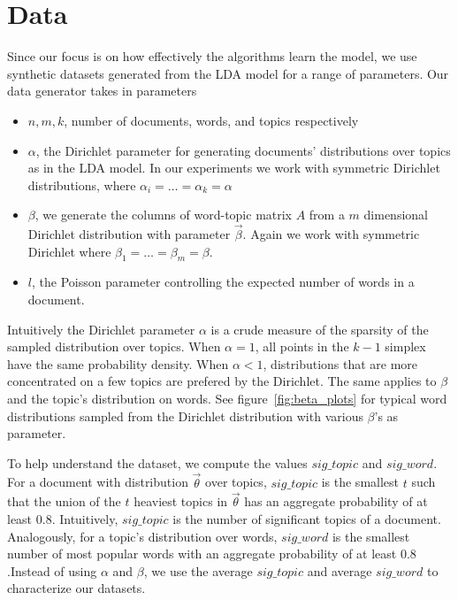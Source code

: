 \documentclass{article}
\begin{document}
\section{Data} \label{sec:data}
Since our focus is on how effectively the algorithms learn the model, we use synthetic datasets generated from the LDA model for a range of parameters. Our data generator takes in parameters
\begin{itemize}
	\item $n,m,k$, number of documents, words, and topics respectively
	\item $\alpha$, the Dirichlet parameter for generating documents' distributions over topics as in the LDA model. In our experiments we work with symmetric Dirichlet distributions, where $\alpha_i=\ldots=\alpha_k=\alpha$
	\item $\beta$, we generate the columns of word-topic matrix $A$ from a $m$ dimensional Dirichlet distribution with parameter $\vec{\beta}$. Again we work with symmetric Dirichlet where $\beta_1=\ldots=\beta_m=\beta$. 
	\item $l$, the Poisson parameter controlling the expected number of words in a document.
\end{itemize}
Intuitively the Dirichlet parameter $\alpha$ is a crude measure of the sparsity of the sampled distribution over topics. When $\alpha=1$, all points in the $k-1$ simplex have the same probability density. When $\alpha<1$, distributions that are more concentrated on a few topics are prefered by the Dirichlet. The same applies to $\beta$ and the topic's distribution on words. See figure~\ref{fig:beta_plots} for typical word distributions sampled from the Dirichlet distribution with various $\beta$'s as parameter. 
\setlength\tabcolsep{0.5pt}
\begin{figure*}
	\centering
	\caption{Plot of distributions on words for various $\beta$. $m=1000$, each distribution is plotted along with its cdf after sorting the words by popularity. Refer to the y-axis on the right for the scaling of the distributions. In general, larger $\beta$ values yield flatter distributions.}
	\label{fig:beta_plots}
\end{figure*} 
\setlength\tabcolsep{6pt}
To help understand the dataset, we compute the values $sig\_topic$ and $sig\_word$. For a document with distribution $\vec{\theta}$ over topics, $sig\_topic$ is the smallest $t$ such that the union of the $t$ heaviest topics in $\vec{\theta}$ has an aggregate probability of at least $0.8$. Intuitively, $sig\_topic$ is the number of significant topics of a document. Analogously, for a topic's distribution over words, $sig\_word$ is the smallest number of most popular words with an aggregate probability of at least $0.8$.Instead of using $\alpha$ and $\beta$, we use the average $sig\_topic$ and average $sig\_word$ to characterize our datasets. 
\end{document}
